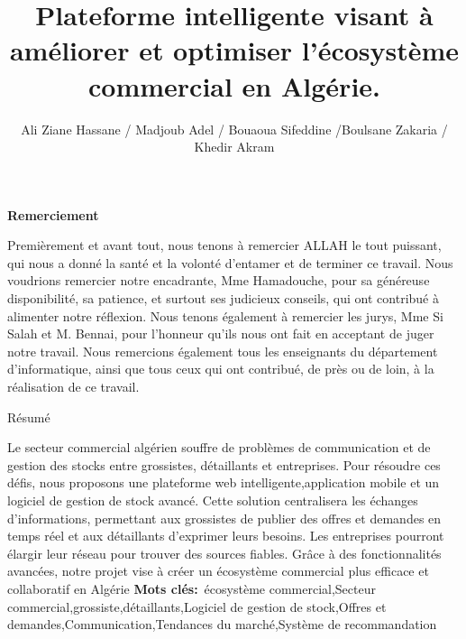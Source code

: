 \documentclass[edit,12pt,a4paper,ChapStyle,oneside,doubleinterligne]{report}
\title{Plateforme intelligente visant à améliorer et optimiser l'écosystème commercial en Algérie.}
\author{Ali Ziane Hassane / Madjoub Adel / Bouaoua Sifeddine
/Boulsane Zakaria  / Khedir Akram}
\begin{document}
\maketitle 
{}


\begin{center}
    \huge{\textbf{Remerciement}}
\end{center}
\begin{large}
    Premièrement et avant tout, nous tenons à remercier ALLAH le tout puissant, qui nous a donné la santé et la volonté d’entamer et de terminer ce travail.
\newline \newline
    Nous voudrions remercier notre encadrante, Mme Hamadouche, pour sa généreuse disponibilité, sa patience, et surtout ses judicieux conseils, qui ont contribué à alimenter notre réflexion.
 \newline \newline   
    Nous tenons également à remercier les jurys, Mme Si Salah et M. Bennai, pour l’honneur qu’ils nous ont fait en acceptant de juger notre travail.
  \newline \newline  
    Nous remercions également tous les enseignants du département d’informatique, ainsi que tous ceux qui ont contribué, de près ou de loin, à la réalisation de ce travail.
\end{large}
\newpage
\begin{center}
\huge{Résumé} 
\end{center}
\phantom{hhhh}Le secteur commercial algérien souffre de problèmes de communication et de gestion des stocks entre grossistes, détaillants et entreprises. Pour résoudre ces défis, nous proposons une plateforme web intelligente,application mobile et un logiciel de gestion de stock avancé. Cette solution centralisera les échanges d'informations, permettant aux grossistes de publier des offres et demandes en temps réel et aux détaillants d'exprimer leurs besoins. Les entreprises pourront élargir leur réseau pour trouver des sources fiables. Grâce à des fonctionnalités avancées, notre projet vise à créer un écosystème commercial plus efficace et collaboratif en Algérie
\newline\textbf{Mots clés:}~écosystème commercial,Secteur commercial,grossiste,détaillants,Logiciel de gestion de stock,Offres et demandes,Communication,Tendances du marché,Système de recommandation
\end{document}
